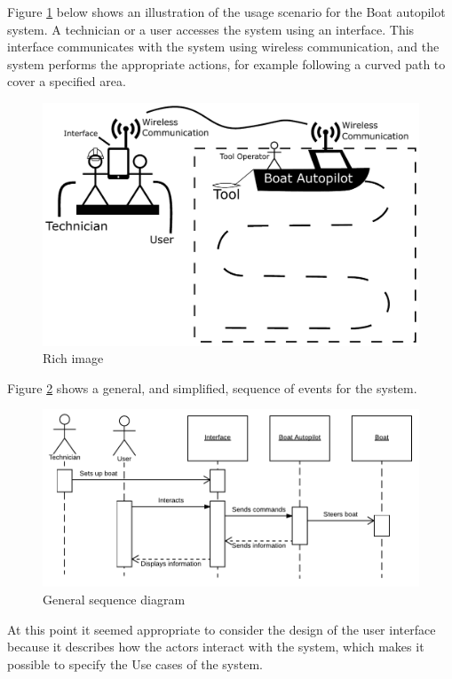 Figure \ref{fig:rich_image} below shows an illustration of the usage scenario for the Boat autopilot system. A technician or a user accesses the system using an interface. This interface communicates with the system using wireless communication, and the system performs the appropriate actions, for example following a curved path to cover a specified area. 

\begin{figure}[H]
	\centering
	\includegraphics[width=1\linewidth]{Images/Introduction/rich_image}
	\caption{Rich image}
	\label{fig:rich_image}
\end{figure}

Figure \ref{fig:general_sd} shows a general, and simplified, sequence of events for the system.

\begin{figure}[H]
	\centering
	\includegraphics[width=1\linewidth]{Images/Introduction/General_SD}
	\caption{General sequence diagram}
	\label{fig:general_sd}
\end{figure}

At this point it seemed appropriate to consider the design of the user interface because it describes how the actors interact with the system, which makes it possible to specify the Use cases of the system. 

